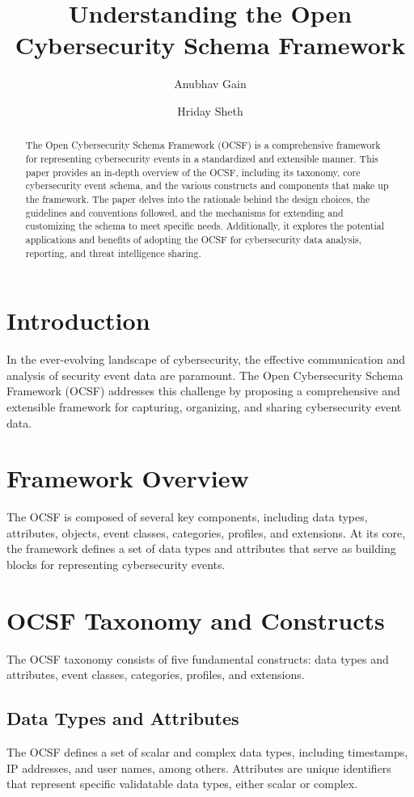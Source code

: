 \documentclass{article}
\title{Understanding the Open Cybersecurity Schema Framework}
\author[1]{Anubhav Gain}
\author[2]{Hriday Sheth}
\affil[1]{DevSecOps, atcults}
\affil[2]{DevOps, atcults}
\begin{document}
\maketitle

\begin{abstract}
The Open Cybersecurity Schema Framework (OCSF) is a comprehensive framework for representing cybersecurity events in a standardized and extensible manner. This paper provides an in-depth overview of the OCSF, including its taxonomy, core cybersecurity event schema, and the various constructs and components that make up the framework. The paper delves into the rationale behind the design choices, the guidelines and conventions followed, and the mechanisms for extending and customizing the schema to meet specific needs. Additionally, it explores the potential applications and benefits of adopting the OCSF for cybersecurity data analysis, reporting, and threat intelligence sharing.
\end{abstract}


\section{Introduction}
In the ever-evolving landscape of cybersecurity, the effective communication and analysis of security event data are paramount. The Open Cybersecurity Schema Framework (OCSF) addresses this challenge by proposing a comprehensive and extensible framework for capturing, organizing, and sharing cybersecurity event data.

\section{Framework Overview}
The OCSF is composed of several key components, including data types, attributes, objects, event classes, categories, profiles, and extensions. At its core, the framework defines a set of data types and attributes that serve as building blocks for representing cybersecurity events.

\section{OCSF Taxonomy and Constructs}
The OCSF taxonomy consists of five fundamental constructs: data types and attributes, event classes, categories, profiles, and extensions.

\subsection{Data Types and Attributes}
The OCSF defines a set of scalar and complex data types, including timestamps, IP addresses, and user names, among others. Attributes are unique identifiers that represent specific validatable data types, either scalar or complex.
\end{document}
